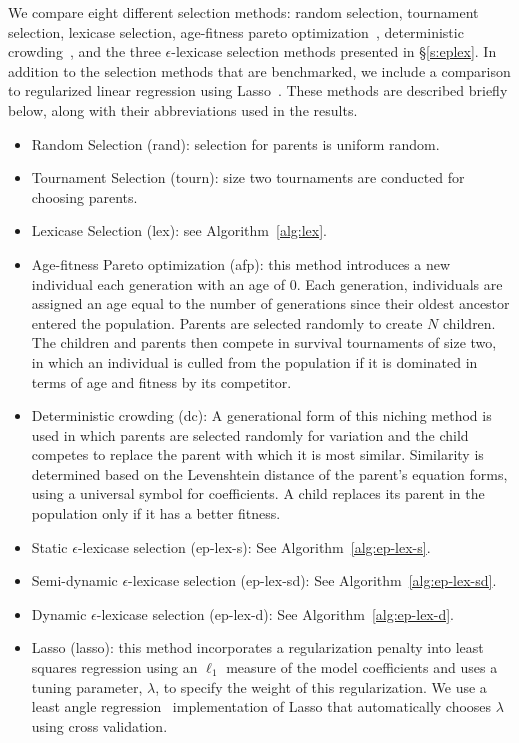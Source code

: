 \documentclass[twoside]{article}
\begin{document}
We compare eight different selection methods: random selection, tournament selection, lexicase selection, age-fitness pareto optimization~\citep{schmidt_age-fitness_2011}, deterministic crowding~\citep{mahfoud_niching_1995}, and the three $\epsilon$-lexicase selection methods presented in \S\ref{s:eplex}. In addition to the selection methods that are benchmarked, we include a comparison to regularized linear regression using Lasso~\citep{tibshirani_regression_1996}. These methods are described briefly below, along with their abbreviations used in the results.
\begin{itemize}
\item Random Selection (rand): selection for parents is uniform random.
\item Tournament Selection (tourn): size two tournaments are conducted for choosing parents. 
\item Lexicase Selection (lex): see Algorithm~\ref{alg:lex}. 
\item Age-fitness Pareto optimization (afp): this method introduces a new individual each generation with an age of 0. Each generation, individuals are assigned an age equal to the number of generations since their oldest ancestor entered the population. Parents are selected randomly to create $N$ children. The children and parents then compete in survival tournaments of size two, in which an individual is culled from the population if it is dominated in terms of age and fitness by its competitor. 
\item Deterministic crowding (dc): A generational form of this niching method is used in which parents are selected randomly for variation and the child competes to replace the parent with which it is most similar. Similarity is determined based on the Levenshtein distance of the parent's equation forms, using a universal symbol for coefficients. A child replaces its parent in the population only if it has a better fitness.
\item Static $\epsilon$-lexicase selection (ep-lex-s): See Algorithm~\ref{alg:ep-lex-s}.
\item Semi-dynamic $\epsilon$-lexicase selection (ep-lex-sd): See Algorithm~\ref{alg:ep-lex-sd}.
\item Dynamic $\epsilon$-lexicase selection (ep-lex-d): See Algorithm~\ref{alg:ep-lex-d}.
\item Lasso (lasso): this method incorporates a regularization penalty into least squares regression using an $\ell_1$ measure of the model coefficients and uses a tuning parameter, $\lambda$, to specify the weight of this regularization. We use a least angle regression~\citep{efron_least_2004} implementation of Lasso that automatically chooses $\lambda$ using cross validation.
\end{itemize} 
\end{document}
